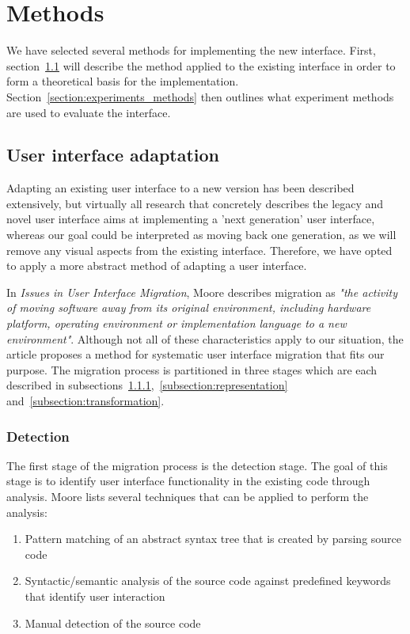 \chapter{Methods}
\label{chapter:methods}
We have selected several methods for implementing the new interface. First, section~\ref{section:userinterfaceadaptation} will describe the method applied to the existing interface in order to form a theoretical basis for the implementation. Section~\ref{section:experiments_methods} then outlines what experiment methods are used to evaluate the interface.

\section{User interface adaptation}
\label{section:userinterfaceadaptation}
Adapting an existing user interface to a new version has been described extensively\cite{classen1997cui, csaba1997experience, kong2000legacy}, but virtually all research that concretely describes the legacy and novel user interface aims at implementing a 'next generation' user interface, whereas our goal could be interpreted as moving back one generation, as we will remove any visual aspects from the existing interface. Therefore, we have opted to apply a more abstract method of adapting a user interface.

In \textit{Issues in User Interface Migration}, Moore describes migration as \textit{"the activity of moving software away from its original environment, including hardware platform, operating environment or implementation language to a new environment"}\cite{moore1993issues}. Although not all of these characteristics apply to our situation, the article proposes a method for systematic user interface migration that fits our purpose. The migration process is partitioned in three stages which are each described in subsections~\ref{subsection:detection},~\ref{subsection:representation} and~\ref{subsection:transformation}.

\subsection{Detection}
\label{subsection:detection}
The first stage of the migration process is the detection stage. The goal of this stage is to identify user interface functionality in the existing code through analysis. Moore lists several techniques that can be applied to perform the analysis:

\begin{enumerate}
	\item \label{item:patternmatching} Pattern matching of an abstract syntax tree that is created by parsing source code
	\item \label{item:syntacticanalysis} Syntactic/semantic analysis of the source code against predefined keywords that identify user interaction 
	\item \label{item:manualdetection} Manual detection of the source code 
\end{enumerate}

